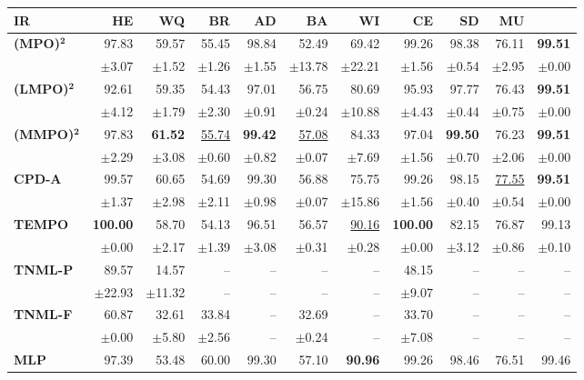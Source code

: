 \begin{table}[!htbp]
\centering
\scriptsize
\begin{tabular}{lrrrrrrrrrr}
\toprule
IR & HE & WQ & BR & AD & BA & WI & CE & SD & MU \\
\midrule
\textbf{(MPO)}$\bm{^2}$ & 97.83 & 59.57 & 55.45 & 98.84 & 52.49 & 69.42 & 99.26 & 98.38 & 76.11 & \textbf{99.51} \\
 & $\pm$3.07 & $\pm$1.52 & $\pm$1.26 & $\pm$1.55 & $\pm$13.78 & $\pm$22.21 & $\pm$1.56 & $\pm$0.54 & $\pm$2.95 & $\pm$0.00 \\
\midrule
\textbf{(LMPO)}$\bm{^2}$ & 92.61 & 59.35 & 54.43 & 97.01 & 56.75 & 80.69 & 95.93 & 97.77 & 76.43 & \textbf{99.51} \\
 & $\pm$4.12 & $\pm$1.79 & $\pm$2.30 & $\pm$0.91 & $\pm$0.24 & $\pm$10.88 & $\pm$4.43 & $\pm$0.44 & $\pm$0.75 & $\pm$0.00 \\
\midrule
\textbf{(MMPO)}$\bm{^2}$ & 97.83 & \textbf{61.52} & \underline{55.74} & \textbf{99.42} & \underline{57.08} & 84.33 & 97.04 & \textbf{99.50} & 76.23 & \textbf{99.51} \\
 & $\pm$2.29 & $\pm$3.08 & $\pm$0.60 & $\pm$0.82 & $\pm$0.07 & $\pm$7.69 & $\pm$1.56 & $\pm$0.70 & $\pm$2.06 & $\pm$0.00 \\
\midrule
\textbf{CPD-A} & 99.57 & 60.65 & 54.69 & 99.30 & 56.88 & 75.75 & 99.26 & 98.15 & \underline{77.55} & \textbf{99.51} \\
 & $\pm$1.37 & $\pm$2.98 & $\pm$2.11 & $\pm$0.98 & $\pm$0.07 & $\pm$15.86 & $\pm$1.56 & $\pm$0.40 & $\pm$0.54 & $\pm$0.00 \\
\midrule
\textbf{TEMPO} & \textbf{100.00} & 58.70 & 54.13 & 96.51 & 56.57 & \underline{90.16} & \textbf{100.00} & 82.15 & 76.87 & 99.13 \\
 & $\pm$0.00 & $\pm$2.17 & $\pm$1.39 & $\pm$3.08 & $\pm$0.31 & $\pm$0.28 & $\pm$0.00 & $\pm$3.12 & $\pm$0.86 & $\pm$0.10 \\
\midrule
\textbf{TNML-P} & 89.57 & 14.57 & -- & -- & -- & -- & 48.15 & -- & -- & -- \\
 & $\pm$22.93 & $\pm$11.32 & -- & -- & -- & -- & $\pm$9.07 & -- & -- & -- \\
\midrule
\textbf{TNML-F} & 60.87 & 32.61 & 33.84 & -- & 32.69 & -- & 33.70 & -- & -- & -- \\
 & $\pm$0.00 & $\pm$5.80 & $\pm$2.56 & -- & $\pm$0.24 & -- & $\pm$7.08 & -- & -- & -- \\
\midrule
\textbf{MLP} & 97.39 & 53.48 & 60.00 & 99.30 & 57.10 & \textbf{90.96} & 99.26 & 98.46 & 76.51 & 99.46 \\

\end{tabular}
\end{table}
